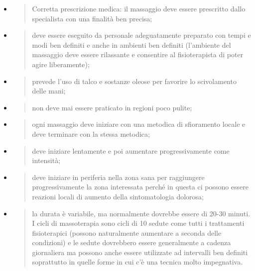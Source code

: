 \documentclass[]{article}
\begin{document}
\begin{itemize}
\item
  \begin{quote}
  Corretta prescrizione medica: il massaggio deve essere prescritto
  dallo specialista con una finalità ben precisa;
  \end{quote}
\item
  \begin{quote}
  deve essere eseguito da personale adeguatamente preparato con tempi e
  modi ben definiti e anche in ambienti ben definiti (l'ambiente del
  massaggio deve essere rilassante e consentire al fisioterapista di
  poter agire liberamente);
  \end{quote}
\item
  \begin{quote}
  prevede l'uso di talco e sostanze oleose per favorire lo scivolamento
  delle mani;
  \end{quote}
\item
  \begin{quote}
  non deve mai essere praticato in regioni poco pulite;
  \end{quote}
\item
  \begin{quote}
  ogni massaggio deve iniziare con una metodica di sfioramento locale e
  deve terminare con la stessa metodica;
  \end{quote}
\item
  \begin{quote}
  deve iniziare lentamente e poi aumentare progressivamente come
  intensità;
  \end{quote}
\item
  \begin{quote}
  deve iniziare in periferia nella zona sana per raggiungere
  progressivamente la zona interessata perché in questa ci possono
  essere reazioni locali di aumento della sintomatologia dolorosa;
  \end{quote}
\item
  \begin{quote}
  la durata è variabile, ma normalmente dovrebbe essere di 20-30 minuti.
  I cicli di massoterapia sono cicli di 10 sedute come tutti i
  trattamenti fisioterapici (possono naturalmente aumentare a seconda
  delle condizioni) e le sedute dovrebbero essere generalmente a cadenza
  giornaliera ma possono anche essere utilizzate ad intervalli ben
  definiti soprattutto in quelle forme in cui c'è una tecnica molto
  impegnativa.
  \end{quote}
\end{itemize}
\end{document}
